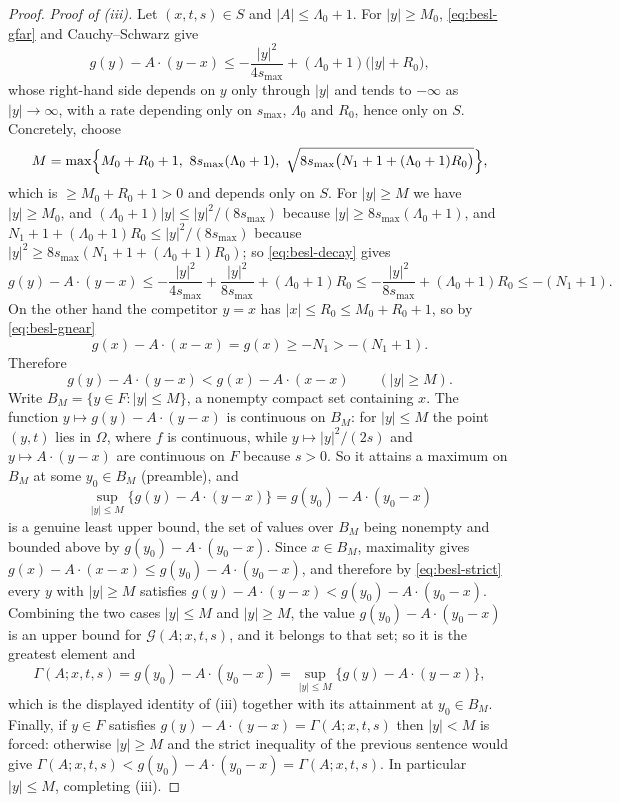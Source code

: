 \begin{proof}
\emph{Proof of (iii).}
Let $(x,t,s)\in S$ and $|A|\le\Lambda_0+1$. For $|y|\ge M_0$,
\eqref{eq:besl-gfar} and Cauchy--Schwarz give
\begin{equation}\label{eq:besl-decay}
  g(y)-A\cdot(y-x)
   \le-\frac{|y|^2}{4s_{\max}}+(\Lambda_0+1)\bigl(|y|+R_0\bigr),
\end{equation}
whose right-hand side depends on $y$ only through $|y|$ and tends to $-\infty$ as
$|y|\to\infty$, with a rate depending only on $s_{\max}$, $\Lambda_0$ and $R_0$,
hence only on $S$. Concretely, choose
\[
  M=\max\Bigl\{M_0+R_0+1,\ 8s_{\max}(\Lambda_0+1),\
     \sqrt{8s_{\max}\bigl(N_1+1+(\Lambda_0+1)R_0\bigr)}\Bigr\},
\]
which is $\ge M_0+R_0+1>0$ and depends only on $S$. For $|y|\ge M$ we have
$|y|\ge M_0$, and $(\Lambda_0+1)|y|\le|y|^2/(8s_{\max})$ because
$|y|\ge8s_{\max}(\Lambda_0+1)$, and
$N_1+1+(\Lambda_0+1)R_0\le|y|^2/(8s_{\max})$ because
$|y|^2\ge8s_{\max}(N_1+1+(\Lambda_0+1)R_0)$; so \eqref{eq:besl-decay} gives
\[
  g(y)-A\cdot(y-x)
   \le-\frac{|y|^2}{4s_{\max}}+\frac{|y|^2}{8s_{\max}}
       +(\Lambda_0+1)R_0
   \le-\frac{|y|^2}{8s_{\max}}+(\Lambda_0+1)R_0
   \le-(N_1+1) .
\]
On the other hand the competitor $y=x$ has $|x|\le R_0\le M_0+R_0+1$, so by
\eqref{eq:besl-gnear}
\[
  g(x)-A\cdot(x-x)=g(x)\ge-N_1>-(N_1+1).
\]
Therefore
\begin{equation}\label{eq:besl-strict}
  g(y)-A\cdot(y-x)<g(x)-A\cdot(x-x)\qquad(|y|\ge M).
\end{equation}
Write $B_M=\{y\in F:|y|\le M\}$, a nonempty compact set containing $x$. The
function $y\mapsto g(y)-A\cdot(y-x)$ is continuous on $B_M$: for $|y|\le M$ the
point $(y,t)$ lies in $\Omega$, where $f$ is continuous, while
$y\mapsto|y|^2/(2s)$ and $y\mapsto A\cdot(y-x)$ are continuous on $F$ because
$s>0$. So it attains a maximum on $B_M$ at some $y_0\in B_M$ (preamble), and
\[
  \sup_{|y|\le M}\bigl\{g(y)-A\cdot(y-x)\bigr\}
   =g(y_0)-A\cdot(y_0-x)
\]
is a genuine least upper bound, the set of values over $B_M$ being nonempty and
bounded above by $g(y_0)-A\cdot(y_0-x)$.
Since $x\in B_M$, maximality gives
$g(x)-A\cdot(x-x)\le g(y_0)-A\cdot(y_0-x)$, and therefore by
\eqref{eq:besl-strict} every $y$ with $|y|\ge M$ satisfies
$g(y)-A\cdot(y-x)<g(y_0)-A\cdot(y_0-x)$. Combining the two cases
$|y|\le M$ and $|y|\ge M$, the value $g(y_0)-A\cdot(y_0-x)$ is an upper bound for
$\mathcal G(A;x,t,s)$, and it belongs to that set; so it is the greatest element
and
\[
  \Gamma(A;x,t,s)=g(y_0)-A\cdot(y_0-x)
   =\sup_{|y|\le M}\bigl\{g(y)-A\cdot(y-x)\bigr\},
\]
which is the displayed identity of (iii) together with its attainment at
$y_0\in B_M$. Finally, if $y\in F$ satisfies
$g(y)-A\cdot(y-x)=\Gamma(A;x,t,s)$ then $|y|<M$ is forced: otherwise $|y|\ge M$
and the strict inequality of the previous sentence would give
$\Gamma(A;x,t,s)<g(y_0)-A\cdot(y_0-x)=\Gamma(A;x,t,s)$. In particular
$|y|\le M$, completing (iii).
\end{proof}
